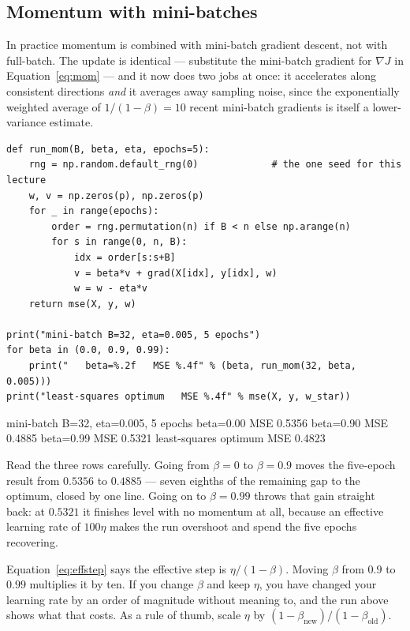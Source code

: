 \documentclass[11pt]{article}
\begin{document}
\subsection{Momentum with mini-batches}

In practice momentum is combined with mini-batch gradient descent, not with
full-batch. The update is identical --- substitute the mini-batch gradient for
$\nabla J$ in Equation~\eqref{eq:mom} --- and it now does two jobs at once:
it accelerates along consistent directions \emph{and} it averages away
sampling noise, since the exponentially weighted average of $1/(1-\beta) = 10$
recent mini-batch gradients is itself a lower-variance estimate.

\begin{lstlisting}
def run_mom(B, beta, eta, epochs=5):
    rng = np.random.default_rng(0)             # the one seed for this lecture
    w, v = np.zeros(p), np.zeros(p)
    for _ in range(epochs):
        order = rng.permutation(n) if B < n else np.arange(n)
        for s in range(0, n, B):
            idx = order[s:s+B]
            v = beta*v + grad(X[idx], y[idx], w)
            w = w - eta*v
    return mse(X, y, w)

print("mini-batch B=32, eta=0.005, 5 epochs")
for beta in (0.0, 0.9, 0.99):
    print("   beta=%.2f   MSE %.4f" % (beta, run_mom(32, beta, 0.005)))
print("least-squares optimum   MSE %.4f" % mse(X, y, w_star))
\end{lstlisting}
\begin{codeout}
mini-batch B=32, eta=0.005, 5 epochs
   beta=0.00   MSE 0.5356
   beta=0.90   MSE 0.4885
   beta=0.99   MSE 0.5321
least-squares optimum   MSE 0.4823
\end{codeout}

Read the three rows carefully. Going from $\beta = 0$ to $\beta = 0.9$ moves
the five-epoch result from $0.5356$ to $0.4885$ --- seven eighths of the
remaining gap to the optimum, closed by one line. Going on to $\beta = 0.99$
throws that gain straight back: at $0.5321$ it finishes level with no momentum
at all, because an effective learning rate of $100\eta$ makes the run overshoot
and spend the five epochs recovering.

\begin{caution}
Equation~\eqref{eq:effstep} says the effective step is $\eta/(1-\beta)$. Moving
$\beta$ from $0.9$ to $0.99$ multiplies it by ten. If you change $\beta$ and
keep $\eta$, you have changed your learning rate by an order of magnitude
without meaning to, and the run above shows what that costs. As a rule of
thumb, scale $\eta$ by $(1-\beta_{\text{new}})/(1-\beta_{\text{old}})$.
\end{caution}
\end{document}

